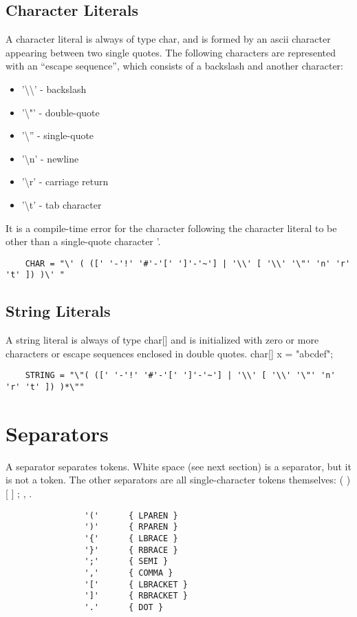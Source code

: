 \begin{homeworkProblem}
	\subsection{Character Literals}
	A character literal is always of type char, and is formed by an ascii character appearing between two single quotes. The following characters are represented with an “escape sequence”, which consists of a backslash and another character:\\
	\begin{itemize}
		\item '\textbackslash\textbackslash' - backslash
		\item '\textbackslash"' - double-quote
		\item '\textbackslash'' - single-quote
		\item '\textbackslash n' - newline
		\item '\textbackslash r' - carriage return
		\item '\textbackslash t' - tab character
	\end{itemize}
	It is a compile-time error for the character following the character literal to be other than a single-quote character '.
	
	\begin{verbatim}
	CHAR = "\' ( ([' '-'!' '#'-'[' ']'-'~'] | '\\' [ '\\' '\"' 'n' 'r' 't' ]) )\' "
	\end{verbatim}
	
	
	\subsection{String Literals}
	A string literal is always of type char[] and is initialized with zero or more characters or escape sequences enclosed in double quotes.
	char[] x = "abcdef";
	
	\begin{verbatim}
	STRING = "\"( ([' '-'!' '#'-'[' ']'-'~'] | '\\' [ '\\' '\"' 'n' 'r' 't' ]) )*\""
	\end{verbatim}
	
	\section{Separators}
	A separator separates tokens. White space (see next section) is a separator, but it is not a token. The other separators are all single-character tokens themselves:
	     ( ) [ ] { } ; , .
	\begin{verbatim}
				'('      { LPAREN }
				')'      { RPAREN }
				'{'      { LBRACE }
				'}'      { RBRACE }
				';'      { SEMI }
				','      { COMMA }
				'['      { LBRACKET }
				']'      { RBRACKET }
				'.'      { DOT }
 	\end{verbatim}
 	

\end{homeworkProblem}
